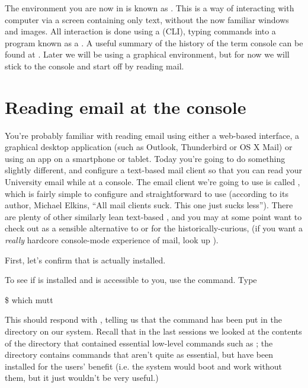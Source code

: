  The environment you are now in is known as . This is a way of interacting with  computer via a screen containing only text, without the now familiar windows and images. All interaction is done using a  (CLI), typing commands into a program known as a . A useful summary of the history of the term console can be found at . Later we will be using a graphical environment, but for now we will stick to the console and start off by reading mail.


\section{Reading email at the console}

You're probably familiar with reading email using either a web-based interface, a graphical desktop application (such as Outlook, Thunderbird or OS X Mail) or using an app on a smartphone or tablet. Today you're going to do something slightly different, and configure a text-based mail client so that you can read your University email while at a console. The email client we're going to use is called , which is fairly simple to configure and straightforward to use (according to its author, Michael Elkins, ``All mail clients suck. This one just sucks less''). There are plenty of other similarly lean text-based , and you may at some point want to check out  as a sensible alternative to  or for the historically-curious,  (if you want a \textit{really} hardcore console-mode experience of mail, look up ).

First, let's confirm that  is actually installed. 

To see if  is installed and is accessible to you, use the  command. Type

\begin{ttoutenv}
\$ which mutt
\end{ttoutenv}

This should respond with , telling us that the  command has been put in the  directory on our system. Recall that  in the last sessions we looked at the contents of the  directory that contained essential low-level commands such as ; the directory  contains commands that aren't quite as essential, but have been installed for the users' benefit (i.e. the system would boot and work without them, but it just wouldn't be very useful.) 

